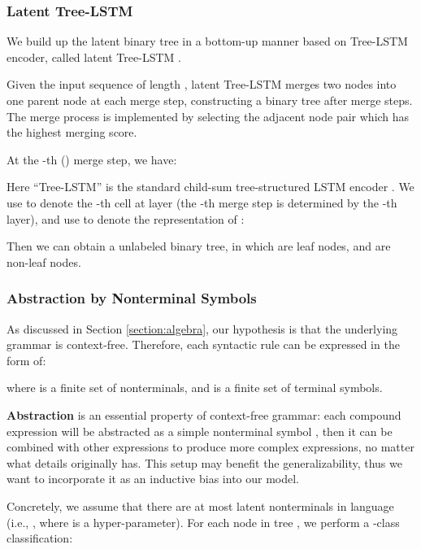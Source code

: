 \documentclass[11pt,a4paper]{article}
\begin{document}
\subsubsection{Latent Tree-LSTM}

We build up the latent binary tree  in a bottom-up manner based on Tree-LSTM encoder, called latent Tree-LSTM \cite{choi2018learning-lt, havrylov2019cooperative-lt}.

Given the input sequence  of length , latent Tree-LSTM merges two nodes into one parent node at each merge step, constructing a binary tree after  merge steps.
The merge process is implemented by selecting the adjacent node pair which has the highest merging score.

At the -th () merge step, we have:


Here ``Tree-LSTM'' is the standard child-sum tree-structured LSTM encoder \cite{tree_lstm_2015-trls}.
We use  to denote the -th cell at layer  (the -th merge step is determined by the -th layer), and use  to denote the representation of :



Then we can obtain a unlabeled binary tree, in which  are leaf nodes, and  are non-leaf nodes.









\subsubsection{Abstraction by Nonterminal Symbols}\label{sec:REDUCE}

As discussed in Section \ref{section:algebra}, our hypothesis is that the underlying grammar  is context-free.
Therefore, each syntactic rule  can be expressed in the form of:

where  is a finite set of nonterminals, and  is a finite set of terminal symbols.

\textbf{Abstraction} is an essential property of context-free grammar:
each compound expression  will be abstracted as a simple nonterminal symbol , then it can be combined with other expressions to produce more complex expressions, no matter what details  originally has.
This setup may benefit the generalizability, thus we want to incorporate it as an inductive bias into our model.



Concretely, we assume that there are at most  latent nonterminals in language  (i.e., , where  is a hyper-parameter).
For each node  in tree , we perform a -class classification:
\end{document}
